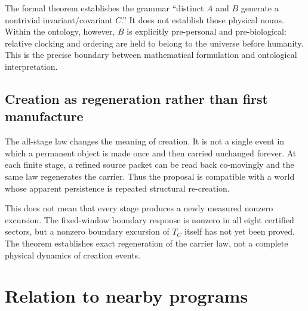 The formal theorem establishes the grammar ``distinct $A$ and $B$ generate a nontrivial invariant/covariant $C$.'' It does not establish those physical nouns. Within the ontology, however, $B$ is explicitly pre-personal and pre-biological: relative clocking and ordering are held to belong to the universe before humanity. This is the precise boundary between mathematical formulation and ontological interpretation.

\subsection{Creation as regeneration rather than first manufacture}

The all-stage law changes the meaning of creation. It is not a single event in which a permanent object is made once and then carried unchanged forever. At each finite stage, a refined source packet can be read back co-movingly and the same law regenerates the carrier. Thus the proposal is compatible with a world whose apparent persistence is repeated structural re-creation.

This does not mean that every stage produces a newly measured nonzero excursion. The fixed-window boundary response is nonzero in all eight certified sectors, but a nonzero boundary excursion of $T_C$ itself has not yet been proved. The theorem establishes exact regeneration of the carrier law, not a complete physical dynamics of creation events.

\section{Relation to nearby programs}

